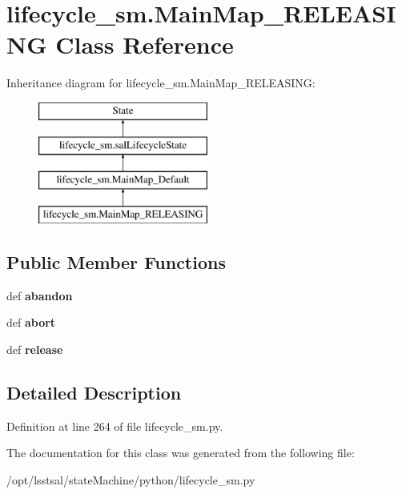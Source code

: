 \hypertarget{classlifecycle__sm_1_1_main_map___r_e_l_e_a_s_i_n_g}{\section{lifecycle\-\_\-sm.\-Main\-Map\-\_\-\-R\-E\-L\-E\-A\-S\-I\-N\-G Class Reference}
\label{classlifecycle__sm_1_1_main_map___r_e_l_e_a_s_i_n_g}
}
Inheritance diagram for lifecycle\-\_\-sm.\-Main\-Map\-\_\-\-R\-E\-L\-E\-A\-S\-I\-N\-G\-:\begin{figure}[H]
\begin{center}
\leavevmode
\includegraphics[height=4.000000cm]{classlifecycle__sm_1_1_main_map___r_e_l_e_a_s_i_n_g}
\end{center}
\end{figure}
\subsection*{Public Member Functions}
\begin{DoxyCompactItemize}
\item 
\hypertarget{classlifecycle__sm_1_1_main_map___r_e_l_e_a_s_i_n_g_a1e8109e8c433c1f03965165d1f6dc5c3}{def {\bfseries abandon}}\label{classlifecycle__sm_1_1_main_map___r_e_l_e_a_s_i_n_g_a1e8109e8c433c1f03965165d1f6dc5c3}

\item 
\hypertarget{classlifecycle__sm_1_1_main_map___r_e_l_e_a_s_i_n_g_a031c88f1661646eabce9feb05fb464c5}{def {\bfseries abort}}\label{classlifecycle__sm_1_1_main_map___r_e_l_e_a_s_i_n_g_a031c88f1661646eabce9feb05fb464c5}

\item 
\hypertarget{classlifecycle__sm_1_1_main_map___r_e_l_e_a_s_i_n_g_a26a4452f385789b606d5c1c385cd50ef}{def {\bfseries release}}\label{classlifecycle__sm_1_1_main_map___r_e_l_e_a_s_i_n_g_a26a4452f385789b606d5c1c385cd50ef}

\end{DoxyCompactItemize}


\subsection{Detailed Description}


Definition at line 264 of file lifecycle\-\_\-sm.\-py.



The documentation for this class was generated from the following file\-:\begin{DoxyCompactItemize}
\item 
/opt/lsstsal/state\-Machine/python/lifecycle\-\_\-sm.\-py\end{DoxyCompactItemize}
